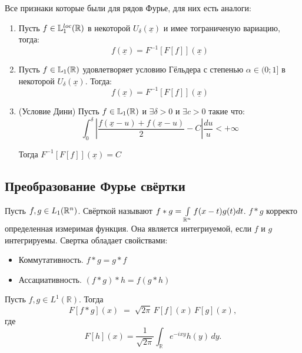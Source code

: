 \begin{corollary}
    Все признаки которые были для рядов Фурье, для них есть аналоги:
    \begin{enumerate}
        \item Пусть $f \in \mathbb{L}^{loc}_1(\mathbb{R})$ в некоторой $U_\delta(\underline{x})$ и имее тограниченую вариацию, тогда:
        \[
            f(\underline{x}) = F^{-1} [F[f]] (\underline{x})
        \]
        \item Пусть $f \in \mathbb{L}_1(\mathbb{R})$ удовлетворяет условию Гёльдера с степенью $\alpha \in (0; 1]$ в некоторой $U_\delta(\underline{x})$. Тогда:
        \[
            f(\underline{x}) = F^{-1} [F[f]] (\underline{x})
        \]
        \item (Условие Дини) Пусть $f \in  \mathbb{L}_1(\mathbb{R})$ и $\exists \delta > 0$ и $\exists c > 0$ такие что:
        \[
            \int_0^\delta | \frac{f(\underline{x} - u)+f(\underline{x} - u)}{2} - C |  \frac{du}{u} < +\infty \]

        Тогда $F^{-1} [F[f]] (\underline{x}) = C$

    \end{enumerate}
\end{corollary}
\subsection{Преобразование Фурье свёртки}
\begin{reminder}
    Пусть $f, g \in L_1(\mathbb{R}^n)$. Свёрткой называют $f * g = \int\limits_{\mathbb{R}^n} f(x-t)g(t)dt$. $f*g$ корректо определенная измеримая функция. Она является интегриуемой, если $f$ и $g$ интегрируемы. Свертка обладает свойствами:
    \begin{itemize}
        \item Коммутативность. $f*g = g*f$
        \item Ассациативность. $(f*g)*h = f(g*h)$
    \end{itemize}
\end{reminder}

\begin{theorem}
    Пусть $f,g\in L^1(\mathbb R)$. Тогда
    \[
        F[f * g](x) \;=\;\sqrt{2\pi}\, F[f](x)\,   F[g](x),
    \]
    где
    \[
        F[h](x)=\frac1{\sqrt{2\pi}}\int_{\mathbb R}e^{-i x y}h(y)\,dy.
    \]
\end{theorem}

